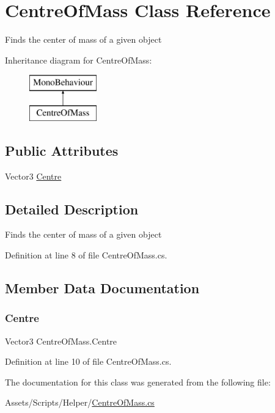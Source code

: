 \hypertarget{class_centre_of_mass}{}\section{Centre\+Of\+Mass Class Reference}
\label{class_centre_of_mass}


Finds the center of mass of a given object  


Inheritance diagram for Centre\+Of\+Mass\+:\begin{figure}[H]
\begin{center}
\leavevmode
\includegraphics[height=2.000000cm]{class_centre_of_mass}
\end{center}
\end{figure}
\subsection*{Public Attributes}
\begin{DoxyCompactItemize}
\item 
Vector3 \mbox{\hyperlink{class_centre_of_mass_a0d92623216fc4f37390fa6a03560c023}{Centre}}
\end{DoxyCompactItemize}


\subsection{Detailed Description}
Finds the center of mass of a given object 



Definition at line 8 of file Centre\+Of\+Mass.\+cs.



\subsection{Member Data Documentation}
\mbox{\label{class_centre_of_mass_a0d92623216fc4f37390fa6a03560c023}} 
\subsubsection{\texorpdfstring{Centre}{Centre}}
{\footnotesize\ttfamily Vector3 Centre\+Of\+Mass.\+Centre}



Definition at line 10 of file Centre\+Of\+Mass.\+cs.



The documentation for this class was generated from the following file\+:\begin{DoxyCompactItemize}
\item 
Assets/\+Scripts/\+Helper/\mbox{\hyperlink{_centre_of_mass_8cs}{Centre\+Of\+Mass.\+cs}}\end{DoxyCompactItemize}
